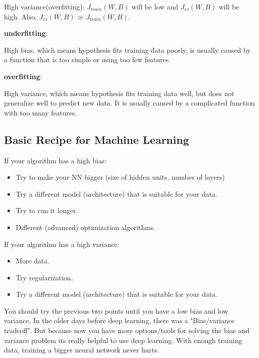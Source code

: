 \documentclass{article}
\begin{document}
\noindent High variance(overfitting): \(J_{train}(W, B)\) will be low and \(J_{cv}(W, B)\) will be high. Also, \(J_{cv}(W, B) \gg J_{train}(W, B)\). 

\bigskip

\noindent \textbf{underfitting}:

\noindent High bias, which means hypothesis fits training data poorly, is usually caused by a function that is too simple or using too few features. 

\bigskip

\noindent \textbf{overfitting}:

\noindent High variance, which means hypothesis fits training data well, but does not generalize well to predict new data. It is usually caused by a complicated function with too many features.

\subsection{Basic Recipe for Machine Learning}

\noindent If your algorithm has a high bias:

\begin{itemize}
  \item Try to make your NN bigger (size of hidden units, number of layers)
  \item Try a different model (architecture) that is suitable for your data.
  \item Try to run it longer.
  \item Different (advanced) optimization algorithms.
\end{itemize}

\noindent If your algorithm has a high variance:

\begin{itemize}
  \item More data.
  \item Try regularization.
  \item Try a different model (architecture) that is suitable for your data.
\end{itemize}

\noindent You should try the previous two points until you have a low bias and low variance. In the older days before deep learning, there was a "Bias/variance tradeoff". But because now you have more options/tools for solving the bias and variance problem its really helpful to use deep learning. With enough training data, training a bigger neural network never hurts.
\end{document}
